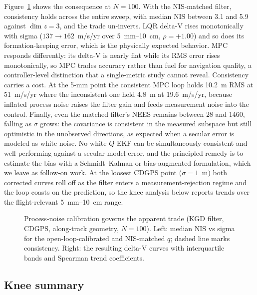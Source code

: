 Figure~\ref{fig:qtuning} shows the consequence at $N = 100$. With the
NIS-matched filter, consistency holds across the entire sweep, with median
NIS between 3.1 and 5.9 against $\dim z = 3$, and the trade un-inverts. LQR
delta-V rises monotonically with sigma ($137 \to 162$~m/s/yr over
5~mm--10~cm, $\rho = +1.00$) and so does its formation-keeping error, which
is the physically expected behavior. MPC responds differently: its delta-V
is nearly flat while its RMS error rises monotonically, so MPC trades
accuracy rather than fuel for navigation quality, a controller-level
distinction that a single-metric study cannot reveal. Consistency carries a
cost. At the 5-mm point the consistent MPC loop holds 10.2~m RMS at
51~m/s/yr where the inconsistent one held 4.8~m at 19.6~m/s/yr, because
inflated process noise raises the filter gain and feeds measurement noise
into the control. Finally, even the matched filter's NEES remains between 28
and 1460, falling as $\sigma$ grows: the covariance is consistent in the
measured subspace but still optimistic in the unobserved directions, as
expected when a secular error is modeled as white noise. No white-$Q$ EKF
can be simultaneously consistent and well-performing against a secular model
error, and the principled remedy is to estimate the bias with a
Schmidt--Kalman or bias-augmented formulation, which we leave as follow-on
work. At the loosest CDGPS point ($\sigma = 1$~m) both corrected curves roll
off as the filter enters a measurement-rejection regime and the loop coasts
on the prediction, so the knee analysis below reports trends over the
flight-relevant 5~mm--10~cm range.

\begin{figure}[t]
  \centering
  \caption{Process-noise calibration governs the apparent trade (KGD
  filter, CDGPS, along-track geometry, $N = 100$). Left: median NIS vs
  sigma for the open-loop-calibrated and NIS-matched $q$; dashed line marks
  consistency. Right: the resulting delta-V curves with interquartile
  bands and Spearman trend coefficients.}
  \label{fig:qtuning}
\end{figure}

\subsection{Knee summary}

